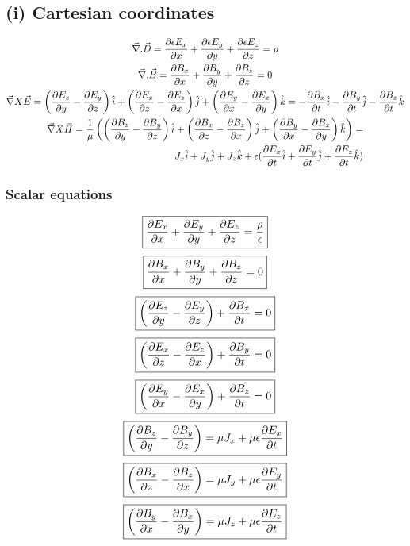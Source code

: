 \documentclass[11pt, a4paper]{article}
\begin{document}
\subsection*{(i) Cartesian coordinates}
\begin{gather}
    \vec{\nabla}.\vec{D} = \pdv{\epsilon E_{x} }{x}+\pdv{\epsilon E_{y} }{y}+\pdv{\epsilon E_{z} }{z} = \rho \\
    \vec{\nabla}.\vec{B} = \pdv{B_{x} }{x}+\pdv{B_{y} }{y}+\pdv{B_{z} }{z} = 0\\
    \vec{\nabla}X\vec{E} = \left(\pdv{E_{z} }{y}-\pdv{E_{y} }{z}\right)\hat{i} +  \left(\pdv{E_{x} }{z}-\pdv{E_{z} }{x}\right)\hat{j} + \left(\pdv{E_{y} }{x}-\pdv{E_{x} }{y}\right)\hat{k} = -\pdv{B_{x} }{t}\hat{i} -\pdv{B_{y} }{t}\hat{j} -\pdv{B_{z} }{t}\hat{k} \\
    \begin{split}
        \vec{\nabla}X\vec{H} = \frac{1}{\mu}\left({\left(\pdv{B_{z} }{y}-\pdv{B_{y} }{z}\right)\hat{i} +  \left(\pdv{B_{x} }{z}-\pdv{B_{z} }{x}\right)\hat{j} + \left(\pdv{B_{y} }{x}-\pdv{B_{x} }{y}\right)\hat{k}}\right)= \\ J_x \hat{i} + J_y \hat{j} + J_{z} \hat{k} + 
        \epsilon (\pdv{E_{x} }{t}\hat{i} +\pdv{E_{y} }{t}\hat{j} +\pdv{E_{z} }{t}\hat{k})
    \end{split}  
\end{gather}
\subsubsection*{Scalar equations}
\begin{equation}
    \boxed{\pdv{ E_{x} }{x}+\pdv{ E_{y} }{y}+\pdv{ E_{z} }{z} = \frac{\rho}{\epsilon}}
\end{equation}
\begin{equation}
    \boxed{\pdv{B_{x} }{x}+\pdv{B_{y} }{y}+\pdv{B_{z} }{z} = 0}
\end{equation}
\begin{equation}
    \boxed{\left(\pdv{E_{z} }{y}-\pdv{E_{y} }{z}\right)+\pdv{B_{x} }{t}=0}
\end{equation}
\begin{equation}
    \boxed{ \left(\pdv{E_{x} }{z}-\pdv{E_{z} }{x}\right)+\pdv{B_{y} }{t}=0}
\end{equation}
\begin{equation}
    \boxed{\left(\pdv{E_{y} }{x}-\pdv{E_{x} }{y}\right)+\pdv{B_{z} }{t}=0}
\end{equation}
\begin{equation}
    \boxed{\left(\pdv{B_{z} }{y}-\pdv{B_{y} }{z}\right)=\mu J_x + \mu\epsilon \pdv{E_x}{t}}
\end{equation}
\begin{equation}
    \boxed{\left(\pdv{B_{x} }{z}-\pdv{B_{z} }{x}\right)= \mu J_y + \mu\epsilon \pdv{E_y}{t}}
\end{equation}
\begin{equation}
    \boxed{\left(\pdv{B_{y} }{x}-\pdv{B_{x} }{y}\right)=\mu J_z + \mu\epsilon \pdv{E_z}{t} }
\end{equation}
\end{document}
